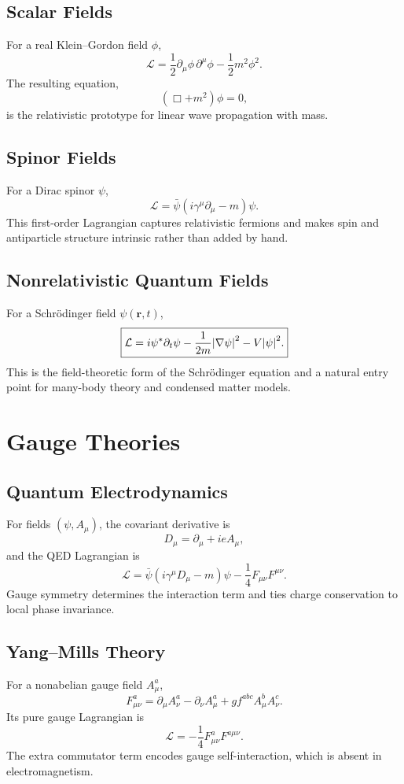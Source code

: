 \documentclass[11pt]{article}
\newcommand{\Lag}{\mathcal{L}}
\begin{document}
\subsection{Scalar Fields}
For a real Klein--Gordon field $\phi$,
\[
\boxed{
\Lag=\frac12 \partial_\mu\phi\,\partial^\mu\phi-\frac12 m^2\phi^2.
}
\]
The resulting equation,
\[
(\Box+m^2)\phi=0,
\]
is the relativistic prototype for linear wave propagation with mass.

\subsection{Spinor Fields}
For a Dirac spinor $\psi$,
\[
\boxed{
\Lag=\bar\psi(i\gamma^\mu\partial_\mu-m)\psi.
}
\]
This first-order Lagrangian captures relativistic fermions and makes spin and
antiparticle structure intrinsic rather than added by hand.

\subsection{Nonrelativistic Quantum Fields}
For a Schr\"odinger field $\psi(\mathbf r,t)$,
\[
\boxed{
\Lag=
i\psi^*\partial_t\psi
-\frac{1}{2m}\abs{\nabla\psi}^2
-V\abs{\psi}^2.
}
\]
This is the field-theoretic form of the Schr\"odinger equation and a natural
entry point for many-body theory and condensed matter models.

\section{Gauge Theories}
\subsection{Quantum Electrodynamics}
For fields $(\psi,A_\mu)$, the covariant derivative is
\[
D_\mu=\partial_\mu+ieA_\mu,
\]
and the QED Lagrangian is
\[
\boxed{
\Lag=
\bar\psi(i\gamma^\mu D_\mu-m)\psi
-\frac14 F_{\mu\nu}F^{\mu\nu}.
}
\]
Gauge symmetry determines the interaction term and ties charge conservation to
local phase invariance.

\subsection{Yang--Mills Theory}
For a nonabelian gauge field $A_\mu^a$,
\[
F_{\mu\nu}^a
=
\partial_\mu A_\nu^a
-\partial_\nu A_\mu^a
+gf^{abc}A_\mu^b A_\nu^c.
\]
Its pure gauge Lagrangian is
\[
\boxed{
\Lag=-\frac14 F_{\mu\nu}^a F^{a\mu\nu}.
}
\]
The extra commutator term encodes gauge self-interaction, which is absent in
electromagnetism.
\end{document}
